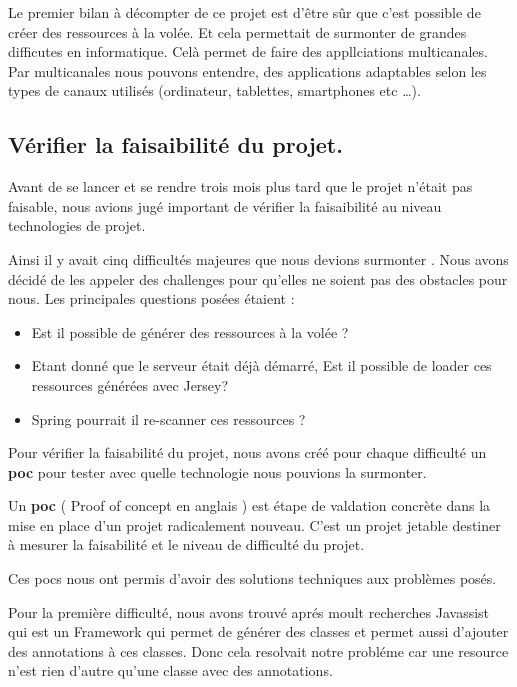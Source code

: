Le premier bilan à décompter de ce projet est d'être sûr que c'est possible de créer des ressources à la volée. Et cela permettait de surmonter de grandes difficutes en informatique. Celà permet de faire des appllciations multicanales. Par multicanales nous pouvons entendre, des applications adaptables selon les types de canaux utilisés (ordinateur, tablettes, smartphones etc {\ldots}).

\subsection{Vérifier la faisaibilité du projet.}
\label{vrifierlafaisaibilitduprojet.}

Avant de se lancer et se rendre trois mois plus tard que le projet n'était pas faisable, nous avions jugé important de vérifier la faisaibilité au niveau technologies de projet. 

Ainsi il y avait cinq difficultés majeures que nous devions surmonter . Nous avons décidé de les appeler des challenges pour qu'elles ne soient pas des obstacles pour nous. Les principales questions posées étaient : 

\begin{itemize}
\item Est il possible de générer des ressources à la volée ?

\item Etant donné que le serveur était déjà démarré, Est il possible de loader ces ressources générées avec Jersey?

\item Spring pourrait il re-scanner ces ressources ?

\end{itemize}

Pour vérifier la faisabilité du projet, nous avons créé pour chaque difficulté un \textbf{poc} pour tester avec quelle technologie nous pouvions la surmonter.

Un \textbf{poc} ( Proof of concept en anglais ) est étape de valdation concrète dans la mise en place d'un projet radicalement nouveau. C'est un projet jetable destiner à mesurer la faisabilité et le niveau de difficulté du projet.

Ces pocs nous ont permis d'avoir des solutions techniques aux problèmes posés.

Pour la première difficulté, nous avons trouvé aprés moult recherches Javassist qui est un Framework qui permet de générer des classes et permet aussi d'ajouter des annotations à ces classes. Donc cela resolvait notre probléme car une resource n'est rien d'autre qu'une classe avec des annotations.

